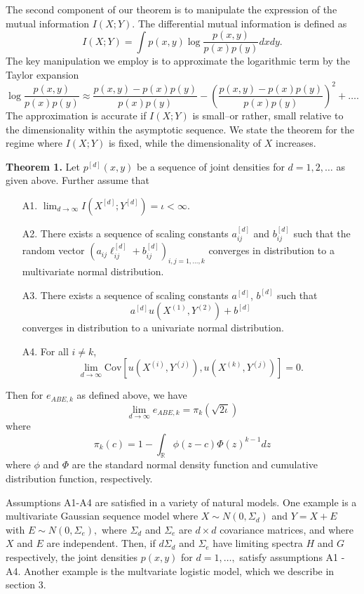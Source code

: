 \documentclass{article}
\newcommand{\Cov}{\text{Cov}}
\begin{document}
The second component of our theorem is to manipulate the expression of the mutual information $I(X; Y)$.
The differential mutual information is defined as
\[
I(X; Y) = \int p(x, y) \log \frac{p(x, y)}{p(x) p(y)} dx dy.
\]
The key manipulation we employ is to approximate the logarithmic term by the Taylor expansion
\[
\log \frac{p(x, y)}{p(x) p(y)} \approx \frac{p(x, y) - p(x) p(y)}{p(x) p(y)} - \left(\frac{p(x, y) - p(x) p(y)}{p(x) p(y)}\right)^2 + \hdots.
\]
The approximation is accurate if $I(X; Y)$ is small--or rather, small relative to the dimensionality within the asymptotic sequence.
We state the theorem for the regime where $I(X; Y)$ is fixed, while the dimensionality of $X$ increases.

\textbf{Theorem 1.} Let $p^{[d]}(x, y)$ be a sequence of joint densities
for $d = 1,2,\hdots$ as given above.  Further assume that
\begin{itemize}
\item[A1.] $\lim_{d \to \infty} I(X^{[d]}; Y^{[d]}) = \iota < \infty.$
\item[A2.] There exists a sequence of scaling constants $a_{ij}^{[d]}$
and $b_{ij}^{[d]}$ such that the random vector $(a_{ij}\ell_{ij}^{[d]} +
b_{ij}^{[d]})_{i, j = 1,\hdots, k}$ converges in distribution to a
multivariate normal distribution.
\item[A3.] There exists a sequence of scaling constants $a^{[d]}$, $b^{[d]}$ such that
\[
a^{[d]}u(X^{(1)}, Y^{(2)}) + b^{[d]}
\]
converges in distribution to a univariate normal distribution.
\item[A4.] For all $i \neq k$,
\[\lim_{d \to \infty}\Cov[u(X^{(i)}, Y^{(j)}), u(X^{(k)}, Y^{(j)})] = 0.\]
\end{itemize}
Then for $e_{ABE, k}$ as defined above, we have
\[
\lim_{d \to \infty} e_{ABE, k} = \pi_k(\sqrt{2 \iota})
\]
where
\[
\pi_k(c) = 1 - \int_{\mathbb{R}} \phi(z - c)  \Phi(z)^{k-1} dz
\]
where $\phi$ and $\Phi$ are the standard normal density function and
cumulative distribution function, respectively.

Assumptions A1-A4 are satisfied in a variety of natural models.
One example is a multivariate Gaussian sequence model where
$X \sim N(0, \Sigma_d)$
and 
$
Y = X + E
$ with
$
E \sim N(0, \Sigma_e),
$
where $\Sigma_d$ and $\Sigma_e$ are $d \times d$ covariance matrices, and where $X$ and $E$ are independent.  Then, if $d \Sigma_d$ and $\Sigma_e$ have limiting spectra $H$ and $G$ respectively,
the joint densities $p(x, y)$ for $d = 1,\hdots, $ satisfy assumptions A1 - A4.
Another example is the multvariate logistic model, which we describe in section 3.
\end{document}

